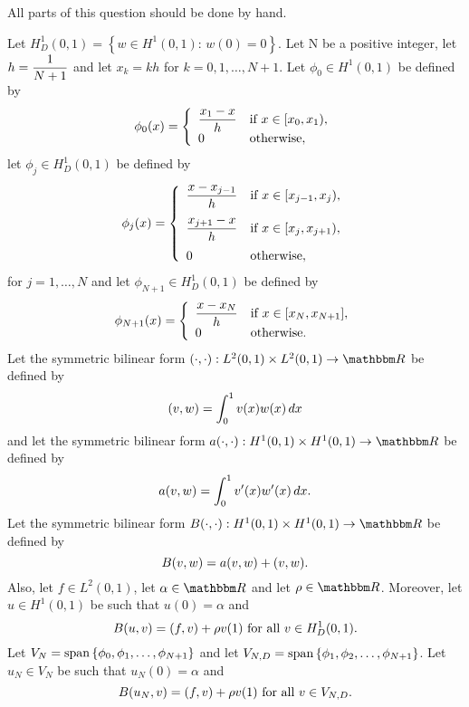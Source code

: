 
All parts of this question should be done by hand.

Let $H^1_D(0,1)=\left\{w\in H^1(0,1):\,w(0)=0\right\}$. Let N be a positive integer, let $\displaystyle{h={1 \over N+1}}$ and let $x_k=kh$ for $k=0,1,\ldots,N+1$. Let $\phi_0\in H^1(0,1)$ be defined by
\[
\phi_0(x) = \left\{\begin{array}{ll}
\displaystyle{x_1-x \over h} & \mbox{if }x\in[x_0,x_1),\\
0& \mbox{otherwise},
\end{array}\right.
\]
let $\phi_j\in H^1_D(0,1)$ be defined by
\[
\phi_j(x) = \left\{\begin{array}{ll}
\displaystyle{{x-x_{j-1} \over h}} & \displaystyle{\mbox{if }x\in[x_{j-1},x_j)},
\\[10pt]
\displaystyle{{x_{j+1}-x \over h}} & \displaystyle{\mbox{if }x\in[x_j,x_{j+1})},
\\[10pt]
0 & \mbox{otherwise},
\end{array}\right.
\]
for $j=1,\ldots,N$ and let $\phi_{N+1}\in H^1_D(0,1)$ be defined by
\[
\phi_{N+1}(x) = \left\{\begin{array}{ll}
\displaystyle{x-x_N \over h} & \mbox{if }x\in[x_N,x_{N+1}],\\
0& \mbox{otherwise.}
\end{array}\right.
\]
Let the symmetric bilinear form $\ip{\cdot,\cdot}:L^2(0,1)\times L^2(0,1)\to\R$ be defined by
\[
(v,w)=\int_0^1v(x)w(x)\,dx
\]
and let the symmetric bilinear form $a\ip{\cdot,\cdot}:H^1(0,1)\times H^1(0,1)\to\R$ be defined by
\[
a(v,w)=\int_0^1v'(x)w'(x)\,dx.
\]
Let the symmetric bilinear form $B\ip{\cdot,\cdot}:H^1(0,1)\times H^1(0,1)\to\R$ be defined by
\[
B(v,w)=a(v,w)+(v,w).
\]
Also, let $f\in L^2(0,1)$, let $\alpha\in\R$ and let $\rho\in\R$. Moreover, let $u\in H^1(0,1)$ be such that $u(0)=\alpha$ and
\[
B(u,v)=(f,v)+\rho v(1)\mbox{ for all }v\in H^1_D(0,1).
\]
Let $V_N={\rm span}\left\{\phi_0,\phi_1,\ldots,\phi_{N+1}\right\}$ and let $V_{N,D}={\rm span}\left\{\phi_1,\phi_2,\ldots,\phi_{N+1}\right\}$. Let $u_N\in V_N$ be such that $u_N(0)=\alpha$ and
\[
B(u_N,v)=(f,v)+\rho v(1)\mbox{ for all }v\in V_{N,D}.
\]
\\
